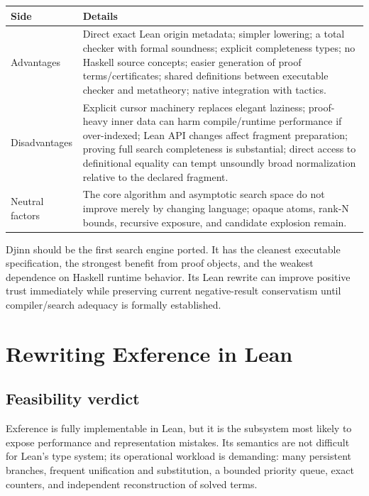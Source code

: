 \documentclass[10pt,letterpaper,oneside]{report}
\begin{document}
\begin{longtable}{@{}L{0.18\textwidth}L{0.74\textwidth}@{}}
\toprule
\textbf{Side} & \textbf{Details} \\
\midrule
\endhead
Advantages & Direct exact Lean origin metadata; simpler lowering; a total checker with formal soundness; explicit completeness types; no Haskell source concepts; easier generation of proof terms/certificates; shared definitions between executable checker and metatheory; native integration with tactics. \\
Disadvantages & Explicit cursor machinery replaces elegant laziness; proof-heavy inner data can harm compile/runtime performance if over-indexed; Lean API changes affect fragment preparation; proving full search completeness is substantial; direct access to definitional equality can tempt unsoundly broad normalization relative to the declared fragment. \\
Neutral factors & The core algorithm and asymptotic search space do not improve merely by changing language; opaque atoms, rank-N bounds, recursive exposure, and candidate explosion remain. \\
\bottomrule
\end{longtable}

\begin{summarybox}
Djinn should be the first search engine ported. It has the cleanest executable specification, the strongest benefit from proof objects, and the weakest dependence on Haskell runtime behavior. Its Lean rewrite can improve positive trust immediately while preserving current negative-result conservatism until compiler/search adequacy is formally established.
\end{summarybox}

\chapter{Rewriting Exference in Lean}\label{ch:exference}

\section{Feasibility verdict}

Exference is fully implementable in Lean, but it is the subsystem most likely to expose performance and representation mistakes. Its semantics are not difficult for Lean's type system; its operational workload is demanding: many persistent branches, frequent unification and substitution, a bounded priority queue, exact counters, and independent reconstruction of solved terms.
\end{document}
